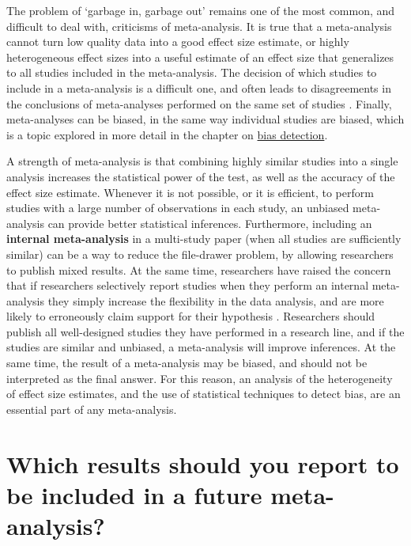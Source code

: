 \documentclass[
  oneside]{krantz}
\begin{document}
The problem of `garbage in, garbage out' remains one of the most common, and difficult to deal with, criticisms of meta-analysis. It is true that a meta-analysis cannot turn low quality data into a good effect size estimate, or highly heterogeneous effect sizes into a useful estimate of an effect size that generalizes to all studies included in the meta-analysis. The decision of which studies to include in a meta-analysis is a difficult one, and often leads to disagreements in the conclusions of meta-analyses performed on the same set of studies \citep{goodyear-smith_analysis_2012, ferguson_comment_2014}. Finally, meta-analyses can be biased, in the same way individual studies are biased, which is a topic explored in more detail in the chapter on \protect\hyperlink{bias}{bias detection}.

A strength of meta-analysis is that combining highly similar studies into a single analysis increases the statistical power of the test, as well as the accuracy of the effect size estimate. Whenever it is not possible, or it is efficient, to perform studies with a large number of observations in each study, an unbiased meta-analysis can provide better statistical inferences. Furthermore, including an \textbf{internal meta-analysis} in a multi-study paper (when all studies are sufficiently similar) can be a way to reduce the file-drawer problem, by allowing researchers to publish mixed results. At the same time, researchers have raised the concern that if researchers selectively report studies when they perform an internal meta-analysis they simply increase the flexibility in the data analysis, and are more likely to erroneously claim support for their hypothesis \citep{vosgerau_99_2019}. Researchers should publish all well-designed studies they have performed in a research line, and if the studies are similar and unbiased, a meta-analysis will improve inferences. At the same time, the result of a meta-analysis may be biased, and should not be interpreted as the final answer. For this reason, an analysis of the heterogeneity of effect size estimates, and the use of statistical techniques to detect bias, are an essential part of any meta-analysis.

\hypertarget{which-results-should-you-report-to-be-included-in-a-future-meta-analysis}{%
\section{Which results should you report to be included in a future meta-analysis?}\label{which-results-should-you-report-to-be-included-in-a-future-meta-analysis}}
\end{document}
